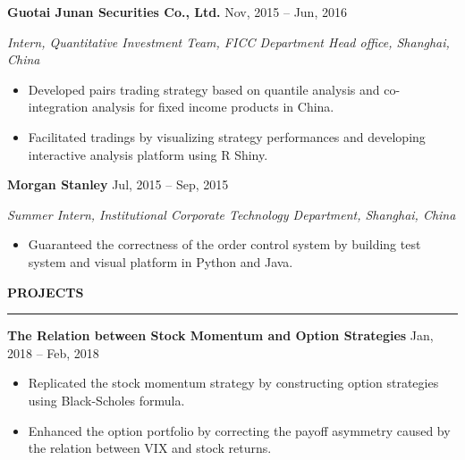 \documentclass[a4paper,12pt]{report}
\newcommand{\marginAdj}{0.5in}
\begin{document}
\noindent 
\textbf{Guotai Junan Securities Co., Ltd.}{\fontsize{9pt}{9pt}\selectfont  \hspace*{3.15in}  \hspace*{\marginAdj} {\fontsize{10pt}{10pt}\selectfont Nov, 2015 – Jun, 2016}} \par
\noindent 
{\fontsize{10pt}{10pt}\selectfont \textit{Intern, Quantitative Investment Team, FICC Department Head office, Shanghai, China}} \par
\noindent 
\begin{itemize}[noitemsep,topsep=0pt]
\item {\fontsize{10pt}{10pt}\selectfont Developed pairs trading strategy based on quantile analysis and co-integration analysis for fixed income products in China.} \par
\item {\fontsize{10pt}{10pt}\selectfont Facilitated tradings by visualizing strategy performances and developing interactive analysis platform using R Shiny.} \par
\end{itemize}

\noindent 
\textbf{Morgan Stanley}{\fontsize{9pt}{9pt}\selectfont  \hspace*{4.4in} \hspace*{\marginAdj} {\fontsize{10pt}{10pt}\selectfont Jul, 2015 – Sep, 2015}} \par
\noindent 
{\fontsize{10pt}{10pt}\selectfont \textit{Summer Intern, Institutional Corporate Technology Department, Shanghai, China}} \par
\noindent 
\begin{itemize}[noitemsep,topsep=0pt]
\item {\fontsize{10pt}{10pt}\selectfont Guaranteed the correctness of the order control system by building test system and visual platform in Python and Java.} \par
\end{itemize}
 \par
\vspace{9pt}



\noindent 
\textbf{PROJECTS} \par
\vspace{2pt}
\hrule
\vspace{6pt}

\noindent
\textbf{The Relation between Stock Momentum and Option Strategies}  \hspace*{\marginAdj}  \hspace*{1.00in} {\fontsize{10pt}{10pt}\selectfont Jan, 2018 – Feb, 2018} \par
\noindent 
\begin{itemize}[noitemsep,topsep=0pt]
	\item {\fontsize{10pt}{10pt}\selectfont Replicated the stock momentum strategy by constructing option strategies using Black-Scholes formula.} \par
	\item {\fontsize{10pt}{10pt}\selectfont Enhanced the option portfolio by correcting the payoff asymmetry caused by the relation between VIX and stock returns.} \par
\end{itemize}
\end{document}
